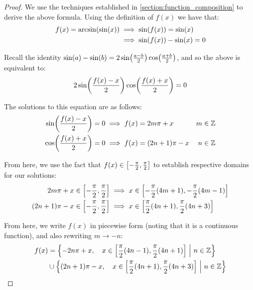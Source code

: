 \begin{proof}
    We use the techniques established in \ref{section:function_composition} to derive the above formula. Using the definition of $f(x)$ we have that:
    \begin{align*}
        f(x)=\arcsin\paren{\sin\paren{x}} &\implies \sin\paren{f(x)}=\sin\paren{x} \\
        &\implies \sin\paren{f(x)}-\sin\paren{x}=0
    \end{align*}

    Recall the identity $\sin\paren{a}-\sin\paren{b}=2\sin\paren*{\frac{a-b}{2}}\cos\paren*{\frac{a+b}{2}}$, and so the above is equivalent to:
    $$
        2\sin\paren*{\frac{f(x)-x}{2}}\cos\paren*{\frac{f(x)+x}{2}}=0
    $$

    The solutions to this equation are as follows\footnotemark:
    \begin{align}
        \sin\paren*{\frac{f(x)-x}{2}}=0 &\implies f(x)=2m\pi+x & m\in\mathbb{Z} \\
        \cos\paren*{\frac{f(x)+x}{2}}=0 &\implies f(x)=(2n+1)\pi-x & n\in\mathbb{Z}
    \end{align}


    From here, we use the fact that $f(x)\in\brak*{-\frac{\pi}{2},\frac{\pi}{2}}$ to establish respective domains for our solutions:
    \begin{align}
        2m\pi+x\in\brak*{-\frac{\pi}{2},\frac{\pi}{2}} &\implies x\in\brak*{-\frac{\pi}{2}(4m+1),-\frac{\pi}{2}(4m-1)} \\
        (2n+1)\pi-x\in\brak*{-\frac{\pi}{2},\frac{\pi}{2}} &\implies x\in\brak*{\frac{\pi}{2}(4n+1),\frac{\pi}{2}(4n+3)}
    \end{align}

    From here, we write $f(x)$ in piecewise form (noting that it is a continuous function), and also rewriting $m\to-n$:
    \begin{align*}
        f(x) &= \pwobj{-2n\pi+x}{x\in\brak*{\frac{\pi}{2}(4n-1),\frac{\pi}{2}(4n+1)}}{n\in\mathbb{Z}} \\
             &\cup \pwobj{(2n+1)\pi-x}{x\in\brak*{\frac{\pi}{2}(4n+1),\frac{\pi}{2}(4n+3)}}{n\in\mathbb{Z}}
    \end{align*}


\end{proof}
